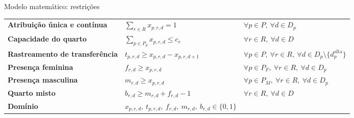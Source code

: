 \documentclass[aspectratio=169,10pt]{beamer}
\newcommand{\framerefs}{}
\newcommand{\slidecites}[1]{\gdef\framerefs{Referências: \cite{#1}}}
\gdef\framerefs{}%
\begin{document}
\begin{frame}{Modelo matemático: restrições}
    \slidecites{ceschia2011local}
    \centering
    \renewcommand{\arraystretch}{1.45}
    \begin{adjustbox}{max width=\textwidth, max totalheight=0.72\textheight}
    \begin{tabular}{@{}l@{\qquad}l@{\qquad}l@{}}
        \toprule
        \textbf{Atribuição única e contínua} & $\displaystyle \sum_{r \in R} x_{p,r,d} = 1$ & $\forall p \in P,\ \forall d \in D_p$ \\
        \textbf{Capacidade do quarto} & $\displaystyle \sum_{p \in P_d} x_{p,r,d} \leq c_r$ & $\forall r \in R,\ \forall d \in D$ \\
        \textbf{Rastreamento de transferência} & $t_{p,r,d} \geq x_{p,r,d} - x_{p,r,d+1}$ & $\forall p \in P,\ \forall r \in R,\ \forall d \in D_p \setminus \{d^{\text{alta}}_p\}$ \\
        \textbf{Presença feminina} & $f_{r,d} \geq x_{p,r,d}$ & $\forall p \in P_F,\ \forall r \in R,\ \forall d \in D_p$ \\
        \textbf{Presença masculina} & $m_{r,d} \geq x_{p,r,d}$ & $\forall p \in P_M,\ \forall r \in R,\ \forall d \in D_p$ \\
        \textbf{Quarto misto} & $b_{r,d} \geq m_{r,d} + f_{r,d} - 1$ & $\forall r \in R,\ \forall d \in D$ \\
        \textbf{Domínio} & $x_{p,r,d},\ t_{p,r,d},\ f_{r,d},\ m_{r,d},\ b_{r,d} \in \{0,1\}$ & \\
        \bottomrule
    \end{tabular}
    \end{adjustbox}
\end{frame}
\end{document}
